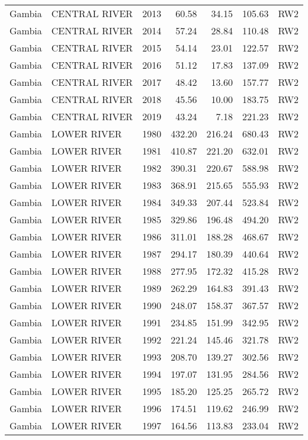 \begin{longtable}{lllrrrl}
  Gambia & CENTRAL RIVER & 2013 & 60.58 & 34.15 & 105.63 & RW2 \\ 
  Gambia & CENTRAL RIVER & 2014 & 57.24 & 28.84 & 110.48 & RW2 \\ 
  Gambia & CENTRAL RIVER & 2015 & 54.14 & 23.01 & 122.57 & RW2 \\ 
  Gambia & CENTRAL RIVER & 2016 & 51.12 & 17.83 & 137.09 & RW2 \\ 
  Gambia & CENTRAL RIVER & 2017 & 48.42 & 13.60 & 157.77 & RW2 \\ 
  Gambia & CENTRAL RIVER & 2018 & 45.56 & 10.00 & 183.75 & RW2 \\ 
  Gambia & CENTRAL RIVER & 2019 & 43.24 & 7.18 & 221.23 & RW2 \\ 
  Gambia & LOWER RIVER & 1980 & 432.20 & 216.24 & 680.43 & RW2 \\ 
  Gambia & LOWER RIVER & 1981 & 410.87 & 221.20 & 632.01 & RW2 \\ 
  Gambia & LOWER RIVER & 1982 & 390.31 & 220.67 & 588.98 & RW2 \\ 
  Gambia & LOWER RIVER & 1983 & 368.91 & 215.65 & 555.93 & RW2 \\ 
  Gambia & LOWER RIVER & 1984 & 349.33 & 207.44 & 523.84 & RW2 \\ 
  Gambia & LOWER RIVER & 1985 & 329.86 & 196.48 & 494.20 & RW2 \\ 
  Gambia & LOWER RIVER & 1986 & 311.01 & 188.28 & 468.67 & RW2 \\ 
  Gambia & LOWER RIVER & 1987 & 294.17 & 180.39 & 440.64 & RW2 \\ 
  Gambia & LOWER RIVER & 1988 & 277.95 & 172.32 & 415.28 & RW2 \\ 
  Gambia & LOWER RIVER & 1989 & 262.29 & 164.83 & 391.43 & RW2 \\ 
  Gambia & LOWER RIVER & 1990 & 248.07 & 158.37 & 367.57 & RW2 \\ 
  Gambia & LOWER RIVER & 1991 & 234.85 & 151.99 & 342.95 & RW2 \\ 
  Gambia & LOWER RIVER & 1992 & 221.24 & 145.46 & 321.78 & RW2 \\ 
  Gambia & LOWER RIVER & 1993 & 208.70 & 139.27 & 302.56 & RW2 \\ 
  Gambia & LOWER RIVER & 1994 & 197.07 & 131.95 & 284.56 & RW2 \\ 
  Gambia & LOWER RIVER & 1995 & 185.20 & 125.25 & 265.72 & RW2 \\ 
  Gambia & LOWER RIVER & 1996 & 174.51 & 119.62 & 246.99 & RW2 \\ 
  Gambia & LOWER RIVER & 1997 & 164.56 & 113.83 & 233.04 & RW2 \\ 

\end{longtable}
